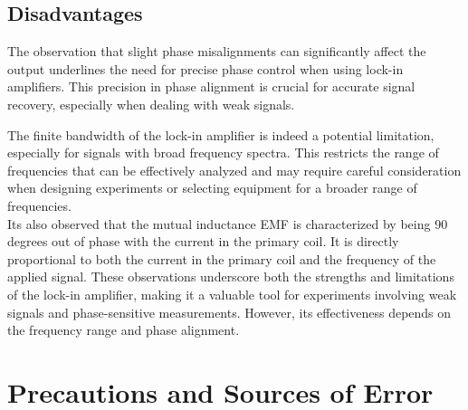 \subsection*{Disadvantages}
The observation that
slight phase misalignments can significantly affect the output underlines the need for precise phase control when using lock-in amplifiers.
This precision in phase alignment is crucial for
accurate signal recovery, especially when dealing with weak signals.

The finite bandwidth of the lock-in amplifier is indeed a potential limitation, especially for signals with broad
frequency spectra. This restricts the range of
frequencies that can be effectively analyzed and
may require careful consideration when designing experiments or selecting equipment for a
broader range of frequencies.\\

Its also observed that the mutual inductance EMF
is characterized by being 90 degrees out of phase
with the current in the primary coil. It is directly
proportional to both the current in the primary coil
and the frequency of the applied signal.
These observations underscore both the strengths
and limitations of the lock-in amplifier, making it
a valuable tool for experiments involving weak signals and phase-sensitive measurements.
However,
its effectiveness depends on the frequency range and
phase alignment.


\section{Precautions and Sources of Error}

